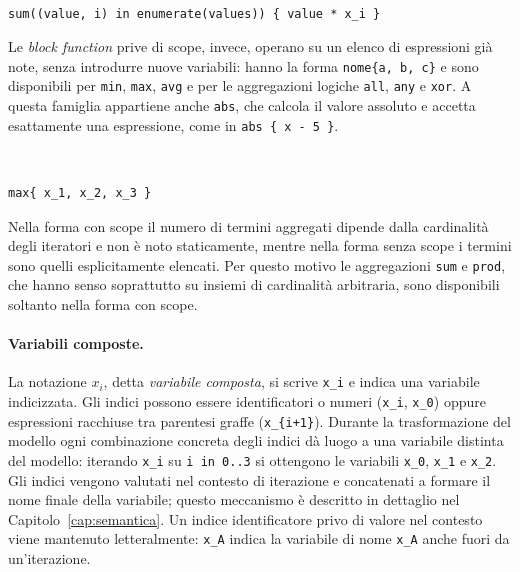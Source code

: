 \

\begin{lstlisting}[caption={Block scoped function: lo scope introduce la variabile \texttt{i} e l'elemento \texttt{value}.}, label={lst:scoped}]
sum((value, i) in enumerate(values)) { value * x_i }
\end{lstlisting}

Le \emph{block function} prive di scope, invece, operano su un elenco di
espressioni già note, senza introdurre nuove variabili: hanno la forma
\texttt{nome\{a, b, c\}} e sono disponibili per \texttt{min}, \texttt{max},
\texttt{avg} e per le aggregazioni logiche \texttt{all}, \texttt{any} e
\texttt{xor}. A questa famiglia appartiene anche \texttt{abs}, che calcola il
valore assoluto e accetta esattamente una espressione, come in
\texttt{abs \{ x - 5 \}}.

\

\begin{lstlisting}[caption={Block function senza scope: opera su espressioni elencate esplicitamente.}, label={lst:noscope}]
max{ x_1, x_2, x_3 }
\end{lstlisting}

Nella forma con scope il numero di termini
aggregati dipende dalla cardinalità degli iteratori e non è noto staticamente,
mentre nella forma senza scope i termini sono quelli esplicitamente elencati.
Per questo motivo le aggregazioni \texttt{sum} e \texttt{prod}, che hanno senso
soprattutto su insiemi di cardinalità arbitraria, sono disponibili soltanto
nella forma con scope.

\paragraph{Variabili composte.}
La notazione $x_i$, detta \emph{variabile composta}, si scrive
\texttt{x\_i} e indica una variabile indicizzata. Gli indici possono essere
identificatori o numeri (\texttt{x\_i}, \texttt{x\_0}) oppure espressioni
racchiuse tra parentesi graffe (\texttt{x\_\{i+1\}}). Durante la trasformazione
del modello ogni combinazione concreta degli indici dà luogo a una variabile
distinta del modello: iterando \texttt{x\_i} su \texttt{i in 0..3} si ottengono
le variabili \texttt{x\_0}, \texttt{x\_1} e \texttt{x\_2}. Gli indici vengono
valutati nel contesto di iterazione e concatenati a formare il nome finale della
variabile; questo meccanismo è descritto in dettaglio nel
Capitolo~\ref{cap:semantica}. Un indice identificatore privo di valore nel
contesto viene mantenuto letteralmente: \texttt{x\_A} indica la variabile di
nome \texttt{x\_A} anche fuori da un'iterazione.

